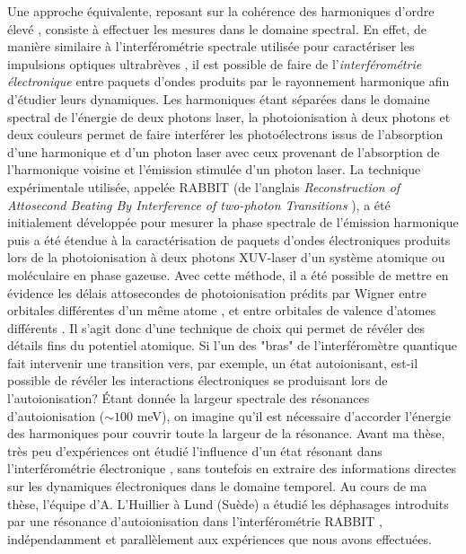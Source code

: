 Une approche équivalente, reposant sur la cohérence des harmoniques d'ordre élevé , consiste à effectuer les mesures dans le domaine spectral. En effet, de manière similaire à l'interférométrie spectrale utilisée pour caractériser les impulsions optiques ultrabrèves , il est possible de faire de l'\textit{interférométrie électronique} entre paquets d'ondes produits par le rayonnement harmonique afin d'étudier leurs dynamiques. Les harmoniques étant séparées dans le domaine spectral de l'énergie de deux photons laser, la photoionisation à deux photons et deux couleurs permet de faire interférer les photoélectrons issus de l'absorption d'une harmonique et d'un photon laser avec ceux provenant de  l'absorption de l'harmonique voisine et l'émission stimulée d'un photon laser. La technique expérimentale utilisée, appelée RABBIT (de l'anglais \textit{Reconstruction of Attosecond Beating By Interference of two-photon Transitions} ), a été initialement développée pour mesurer la phase spectrale de l'émission harmonique  puis a été étendue à la caractérisation de paquets d'ondes électroniques produits lors de la photoionisation à deux photons XUV-laser d'un système atomique ou moléculaire en phase gazeuse. Avec cette méthode, il a été possible de mettre en évidence les délais attosecondes de photoionisation prédits par Wigner entre orbitales différentes d'un même atome , et entre orbitales de valence d'atomes différents . Il s'agit donc d'une technique de choix qui permet de révéler des détails fins du potentiel atomique. Si l'un des "bras" de l'interféromètre quantique fait intervenir une transition vers, par exemple, un état autoionisant, est-il possible de révéler les interactions électroniques se produisant lors de l'autoionisation? \'{E}tant donnée la largeur spectrale des résonances d'autoionisation ($\sim 100$ meV), on imagine qu'il est nécessaire d'accorder l'énergie des harmoniques pour couvrir toute la largeur de la résonance. Avant ma thèse, très peu d'expériences ont étudié l'influence d'un état résonant dans l'interférométrie électronique , sans toutefois en extraire des informations directes sur les dynamiques électroniques dans le domaine temporel. Au cours de ma thèse, l'équipe d'A. L'Huillier à Lund (Suède) a étudié les déphasages introduits par une résonance d'autoionisation dans l'interférométrie RABBIT , indépendamment et parallèlement aux expériences que nous avons effectuées.

